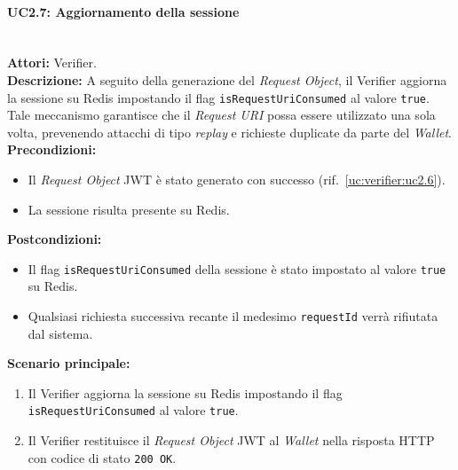 \paragraph{\large\bfseries UC2.7: Aggiornamento della sessione}
\label{uc:verifier:uc2.7}
\mbox{}\\
\noindent\textbf{Attori:} Verifier.
\\
\noindent\textbf{Descrizione:} A seguito della generazione del \textit{Request Object}, il Verifier aggiorna la sessione su Redis impostando il flag \texttt{isRequestUriConsumed} al valore \texttt{true}. Tale meccanismo garantisce che il \textit{Request URI} possa essere utilizzato una sola volta, prevenendo attacchi di tipo \textit{replay} e richieste duplicate da parte del \textit{Wallet}.
\\
\noindent\textbf{Precondizioni:}
\begin{itemize}
    \item Il \textit{Request Object} JWT è stato generato con successo (rif.\ \ref{uc:verifier:uc2.6}).
    \item La sessione risulta presente su Redis.
\end{itemize}
\noindent\textbf{Postcondizioni:}
\begin{itemize}
    \item Il flag \texttt{isRequestUriConsumed} della sessione è stato impostato al valore \texttt{true} su Redis.
    \item Qualsiasi richiesta successiva recante il medesimo \texttt{requestId} verrà rifiutata dal sistema.
\end{itemize}
\noindent\textbf{Scenario principale:}
\begin{enumerate}
    \item Il Verifier aggiorna la sessione su Redis impostando il flag \texttt{isRequestUriConsumed} al valore \texttt{true}.
    \item Il Verifier restituisce il \textit{Request Object} JWT al \textit{Wallet} nella risposta HTTP con codice di stato \texttt{200 OK}.
\end{enumerate}

